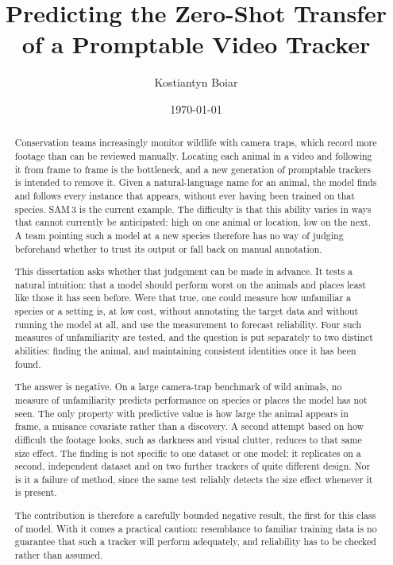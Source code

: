 \documentclass{mproj}
\begin{document}
\title{Predicting the Zero-Shot Transfer of a Promptable Video Tracker}
\author{Kostiantyn Boiar}
\date{\today}
\maketitle

\begin{abstract}
Conservation teams increasingly monitor wildlife with camera traps, which record more footage than can be
reviewed manually. Locating each animal in a video and following it from frame to frame is the bottleneck,
and a new generation of promptable trackers is intended to remove it. Given a natural-language name for an
animal, the model finds and follows every instance that appears, without ever having been trained on that
species. SAM\,3 is the current example. The difficulty is that this ability varies in ways that cannot
currently be anticipated: high on one animal or location, low on the next. A team pointing such a model at a
new species therefore has no way of judging beforehand whether to trust its output or fall back on manual
annotation.

This dissertation asks whether that judgement can be made in advance. It tests a natural intuition: that a
model should perform worst on the animals and places least like those it has seen before. Were that true,
one could measure how unfamiliar a species or a setting is, at low cost, without annotating the target data
and without running the model at all, and use the measurement to forecast reliability. Four such measures of
unfamiliarity are tested, and the question is put separately to two distinct abilities: finding the animal,
and maintaining consistent identities once it has been found.

The answer is negative. On a large camera-trap benchmark of wild animals, no measure of unfamiliarity
predicts performance on species or places the model has not seen. The only property with predictive value is
how large the animal appears in frame, a nuisance covariate rather than a discovery. A second attempt based
on how difficult the footage looks, such as darkness and visual clutter, reduces to that same size effect.
The finding is not specific to one dataset or one model: it replicates on a second, independent dataset and
on two further trackers of quite different design. Nor is it a failure of method, since the same test
reliably detects the size effect whenever it is present.

The contribution is therefore a carefully bounded negative result, the first for this class of model. With
it comes a practical caution: resemblance to familiar training data is no guarantee that such a tracker will
perform adequately, and reliability has to be checked rather than assumed.
\end{abstract}
\end{document}
